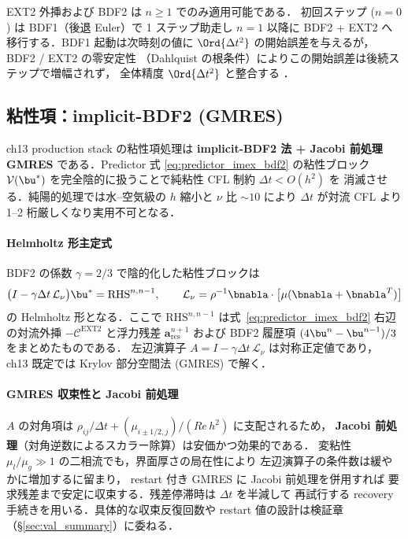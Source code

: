 \begin{tcolorbox}[warnbox, title={IMEX-BDF2 / EXT2 起動問題（$n=0,1$）}]
\label{warn:bdf2_startup}
EXT2 外挿および BDF2 は $n\ge 1$ でのみ適用可能である．
初回ステップ ($n=0$) は BDF1（後退 Euler）で 1 ステップ助走し
$n=1$ 以降に BDF2 + EXT2 へ移行する．BDF1 起動は次時刻の値に
$\Ord{\Delta t^2}$ の開始誤差を与えるが，BDF2 / EXT2 の零安定性
（Dahlquist の根条件）によりこの開始誤差は後続ステップで増幅されず，
全体精度 $\Ord{\Delta t^2}$ と整合する \cite{DahlquistBjorck1974}．
\end{tcolorbox}

\subsection{粘性項：implicit-BDF2 (GMRES)}
\label{sec:time_viscous}

ch13 production stack の粘性項処理は \textbf{implicit-BDF2 法 + Jacobi 前処理 GMRES}
である．Predictor 式 \eqref{eq:predictor_imex_bdf2} の粘性ブロック
$\mathcal{V}(\bu^*)$ を完全陰的に扱うことで純粘性 CFL 制約 $\Delta t < O(h^2)$ を
消滅させる．純陽的処理では水--空気級の $h$ 縮小と $\nu$ 比 $\sim 10$ により
$\Delta t$ が対流 CFL より 1--2 桁厳しくなり実用不可となる．

\paragraph{Helmholtz 形主定式}
BDF2 の係数 $\gamma=2/3$ で陰的化した粘性ブロックは
\begin{equation}
  \bigl(I - \gamma\Delta t\,\mathcal{L}_{\nu}\bigr)\bu^* = \mathrm{RHS}^{n,n-1},
  \qquad
  \mathcal{L}_{\nu} = \rho^{-1}\bnabla\cdot\bigl[\mu(\bnabla + \bnabla^T)\bigr]
  \label{eq:helmholtz_implicit_bdf2}
\end{equation}
の Helmholtz 形となる．ここで $\mathrm{RHS}^{n,n-1}$ は式~\eqref{eq:predictor_imex_bdf2}
右辺の対流外挿 $-\mathcal{C}^{\mathrm{EXT2}}$ と浮力残差 $\bm{a}^{n+1}_{\mathrm{res}}$
および BDF2 履歴項 $(4\bu^n - \bu^{n-1})/3$ をまとめたものである．
左辺演算子 $A = I - \gamma\Delta t\,\mathcal{L}_{\nu}$ は対称正定値であり，
ch13 既定では Krylov 部分空間法 (GMRES) で解く．

\paragraph{GMRES 収束性と Jacobi 前処理}
$A$ の対角項は $\rho_{ij}/\Delta t + (\mu_{i\pm 1/2,j})/(Re\,h^2)$ に支配されるため，
\textbf{Jacobi 前処理}（対角逆数によるスカラー除算）は安価かつ効果的である．
変粘性 $\mu_l/\mu_g \gg 1$ の二相流でも，界面厚さの局在性により
左辺演算子の条件数は緩やかに増加するに留まり，
restart 付き GMRES に Jacobi 前処理を併用すれば
要求残差まで安定に収束する．残差停滞時は $\Delta t$ を半減して
再試行する recovery 手続きを用いる．具体的な収束反復回数や
restart 値の設計は検証章（\S\ref{sec:val_summary}）に委ねる．

